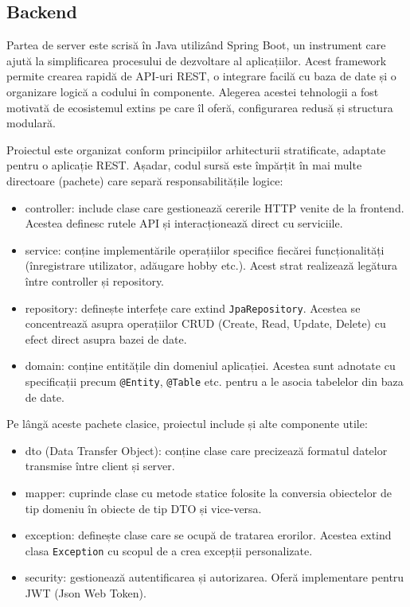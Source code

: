 \subsection{Backend}
\label{subsec:ch4sec1sub2}
Partea de server este scrisă în Java utilizând Spring Boot\cite{springbootdocs}, un instrument care ajută la simplificarea procesului de dezvoltare al aplicațiilor.
Acest framework permite crearea rapidă de API-uri REST, o integrare facilă cu baza de date și o organizare logică a codului în componente. Alegerea
acestei tehnologii a fost motivată de ecosistemul extins pe care îl oferă, configurarea redusă și structura modulară. 

\par
Proiectul este organizat conform principiilor arhitecturii stratificate, adaptate pentru o aplicație REST. 
Așadar, codul sursă este împărțit în mai multe directoare (pachete) care separă responsabilitățile logice: 
\begin{itemize}
    \item controller: include clase care gestionează cererile HTTP venite de la frontend. Acestea definesc rutele API și interacționează direct cu serviciile.
    \item service: conține implementările operațiilor specifice fiecărei funcționalități (înregistrare utilizator, adăugare hobby etc.). Acest strat realizează legătura între controller și repository. 
    \item repository: definește interfețe care extind \texttt{JpaRepository}. Acestea se concentrează asupra operațiilor CRUD (Create, Read, Update, Delete) cu efect direct asupra bazei de date.
    \item domain: conține entitățile din domeniul aplicației. Acestea sunt adnotate cu specificații precum \texttt{@Entity}, \texttt{@Table} etc. pentru a le asocia tabelelor din baza de date.
\end{itemize}  
Pe lângă aceste pachete clasice, proiectul include și alte componente utile:
\begin{itemize} 
    \item dto (Data Transfer Object): conține clase care precizează formatul datelor transmise între client și server.
    \item mapper: cuprinde clase cu metode statice folosite la conversia obiectelor de tip domeniu în obiecte de tip DTO și vice-versa.
    \item exception: definește clase care se ocupă de tratarea erorilor. Acestea extind clasa \texttt{Exception} cu scopul de a crea excepții personalizate.
    \item security: gestionează autentificarea și autorizarea. Oferă implementare pentru JWT (Json Web Token).
\end{itemize}
